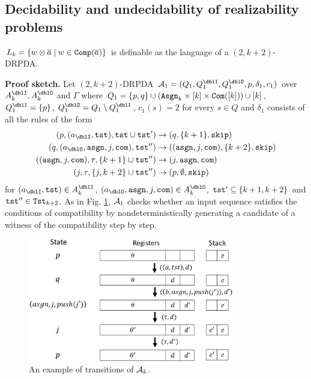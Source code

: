 \subsection{Decidability and undecidability of realizability problems}
\begin{lemma}\label{lem: Lk}
$L_k = \{w\otimes{\overline{a}} \mid w\in{\mathtt{Comp}}({\overline{a}})\}$ is definable as the language of a $(2,k+2)$-DRPDA.
\end{lemma}
{\bf Proof sketch.}\quad
Let $(2,k+2)$-DRPDA
$\calA_1=(Q_1, Q^\dblI_1, Q^\dblO_1, p, \delta_1, c_1)$
over $A_k^\dblI, A_k^\dblO$ and $\Gamma$ where
$Q_1=\{p, q\}\cup(\mathtt{Asgn}_k\times[k]\times\mathtt{Com}([k]))\cup[k]$, $Q^\dblI_1=\{p\}$, $Q^\dblO_1 = Q_1\setminus Q^\dblI_1$,
$c_1(s)=2$ for every $s\in Q$ and $\delta_1$ consists of all the rules of the form
\begin{align}
(p, (a_\dblI, \tst), \tst\cup\tst')&\to(q, \{k+1\}, \skip)\label{eq: Lk1}\\
(q, (a_\dblO, \asgn, j, \com), \tst'')&\to((\asgn,j,\com), \{k+2\},\skip)\label{eq: Lk2}\\
((\asgn,j,\com), \tau, \{k+1\}\cup\tst'')&\to(j, \asgn, \com)\label{eq: Lk3}\\
(j, \tau, \{j, k+2\}\cup\tst'')&\to(p, \emptyset, \skip)\label{eq: Lk4}
\end{align}
for $(a_\dblI, \tst)\in A_k^\dblI$, $(a_\dblO, \asgn, j, \com)\in A_k^\dblO$, $\mathtt{tst}'\subseteq \{k+1,k+2\}$ and $\mathtt{tst}''\in\mathtt{Tst}_{k+2}$.
As in Fig. \ref{fig: lem_Lk},
${\cal A}_1$ checks whether an input sequence satisfies the conditions of compatibility
by nondeterministically generating a candidate of a witness of the compatibility step by step.
\begin{figure}[t]
  \centering
  \includegraphics[width=9cm]{lem_Lk.png}
  \caption{An example of transitions of ${\cal A}_k$.}
  \label{fig: lem_Lk}
\end{figure}

